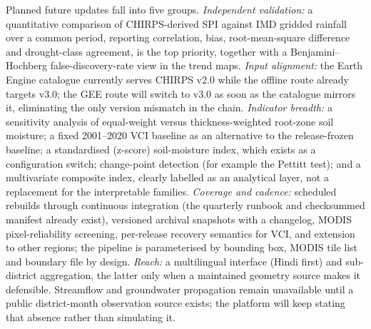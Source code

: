 \documentclass[10pt,a4paper]{article}
\begin{document}
Planned future updates fall into five groups. \emph{Independent validation:} a quantitative comparison of CHIRPS-derived SPI against IMD gridded rainfall\citep{Pai2014,Srivastava2009} over a common period, reporting correlation, bias, root-mean-square difference and drought-class agreement, is the top priority, together with a Benjamini--Hochberg false-discovery-rate view in the trend maps. \emph{Input alignment:} the Earth Engine catalogue currently serves CHIRPS v2.0 while the offline route already targets v3.0; the GEE route will switch to v3.0 as soon as the catalogue mirrors it, eliminating the only version mismatch in the chain. \emph{Indicator breadth:} a sensitivity analysis of equal-weight versus thickness-weighted root-zone soil moisture; a fixed 2001--2020 VCI baseline as an alternative to the release-frozen baseline; a standardised (z-score) soil-moisture index, which exists as a configuration switch; change-point detection (for example the Pettitt test\citep{Pettitt1979}); and a multivariate composite index, clearly labelled as an analytical layer, not a replacement for the interpretable families\citep{HaoSingh2015}. \emph{Coverage and cadence:} scheduled rebuilds through continuous integration (the quarterly runbook and checksummed manifest already exist), versioned archival snapshots with a changelog, MODIS pixel-reliability screening, per-release recovery semantics for VCI, and extension to other regions; the pipeline is parameterised by bounding box, MODIS tile list and boundary file by design. \emph{Reach:} a multilingual interface (Hindi first) and sub-district aggregation, the latter only when a maintained geometry source makes it defensible. Streamflow and groundwater propagation remain unavailable until a public district-month observation source exists; the platform will keep stating that absence rather than simulating it.
\end{document}
